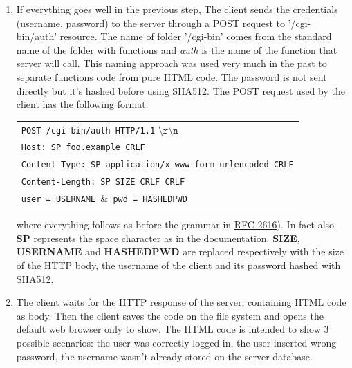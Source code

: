 \begin{enumerate}
\item{If everything goes well in the previous step, The client sends the credentials (username, password) to the server through a POST request to '/cgi-bin/auth' resource. The name of folder '/cgi-bin' comes from the standard name of the folder with functions and \textit{auth} is the name of the function that server will call. This naming approach was used very much in the past to separate functions code from pure HTML code. The password is not sent directly but it's hashed before using SHA512. The POST request used by the client has the following format:\\
\begin{table}[H]
\hspace{2cm}\centering\footnotesize
\begin{tabular}{|l|}
\hline
\texttt{POST /cgi-bin/auth HTTP/1.1} $\mathtt{\setminus r\setminus n}$\\
\texttt{Host: SP foo.example CRLF}\\
\texttt{Content-Type: SP application/x-www-form-urlencoded CRLF}\\
\texttt{Content-Length: SP SIZE CRLF CRLF}\\
\texttt{user = USERNAME $\mathtt{\&}$ pwd = HASHEDPWD}\\
\hline
\end{tabular}
\end{table}
where everything follows as before the grammar in \href{https://tools.ietf.org/html/rfc2616}{RFC 2616}). In fact also \textbf{SP} represents the space character as in the documentation. \textbf{SIZE}, \textbf{USERNAME} and \textbf{HASHEDPWD} are replaced respectively with the size of the HTTP body, the username of the client and its password hashed with SHA512.
}
\item{The client waits for the HTTP response of the server, containing HTML code as body. Then the client saves the code on the file system and opens the default web browser only to show. The HTML code is intended to show 3 possible scenarios: the user was correctly logged in, the user inserted wrong password, the username wasn't already stored on the server database.}
\end{enumerate}

